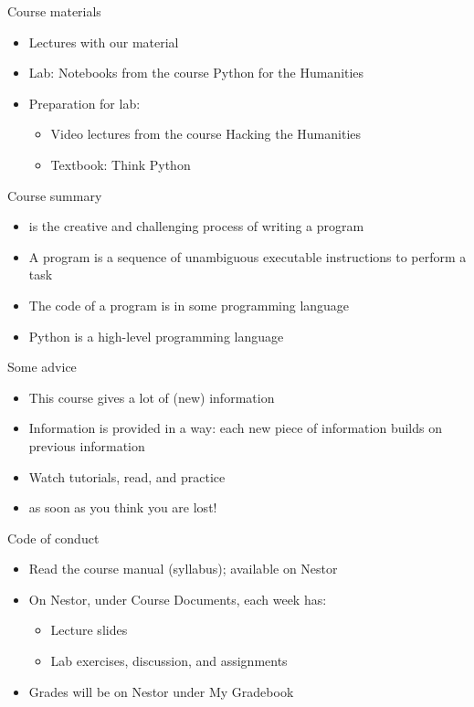 \documentclass[aspectratio=169,usenames,dvipsnames]{beamer}
\begin{document}
\begin{frame}{Course materials}
    \begin{itemize}
        \item Lectures with our material
        \item Lab: Notebooks from the course Python for the Humanities
        \item Preparation for lab:
            \begin{itemize}
                \item Video lectures from the course Hacking the Humanities
                \item Textbook: Think Python
            \end{itemize}
    \end{itemize}
\end{frame}

\begin{frame}{Course summary}
    \begin{itemize}
        \item {} is the creative and challenging process
            of writing a program
        \item A program is a sequence of unambiguous executable
            instructions to perform a task
        \item The code of a program is in some programming language
        \item Python is a high-level programming language
    \end{itemize}
\end{frame}

\begin{frame}{Some advice}
    \begin{itemize}
        \item This course gives a lot of (new) information
        \item Information is provided in a  way:
            each new piece of information builds on previous information
        \item Watch tutorials, read, and practice
        \item {} as soon as you think you are lost!
    \end{itemize}
\end{frame}

\begin{frame}{Code of conduct}
    \begin{itemize}
        \item Read the course manual (syllabus); available on Nestor
        \item On Nestor, under Course Documents, each week has:
            \begin{itemize}
                \item Lecture slides
                \item Lab exercises, discussion, and assignments
            \end{itemize}
        \item Grades will be on Nestor under My Gradebook
    \end{itemize}
\end{frame}
\end{document}
